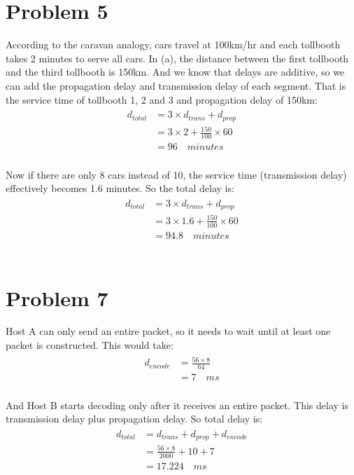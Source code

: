 \documentclass[titlepage, paper=a4, fontsize=11pt]{scrartcl} %
\numberwithin{equation}{section} %
\numberwithin{figure}{section} %
\numberwithin{table}{section} %
\begin{document}
\section*{Problem 5}
According to the caravan analogy, cars travel at 100km/hr and each tollbooth takes 2 minutes to serve all cars.
In (a), the distance between the first tollbooth and the third tollbooth is 150km. And we know that delays are
additive, so we can add the propagation delay and transmission delay of each segment. That is the service time of
tollbooth 1, 2 and 3 and propagation delay of 150km:
\begin{align*} 
\begin{split}
d_{total} &= 3 \times d_{trans} + d_{prop} \\
&= 3 \times 2 + \frac{150}{100} \times 60 \\
&= 96 \quad minutes
\end{split}					
\end{align*}
\\
Now if there are only 8 cars instead of 10, the service time (transmission delay) effectively becomes 1.6 minutes.
So the total delay is:
\begin{align*} 
\begin{split}
d_{total} &= 3 \times d_{trans} + d_{prop} \\
&= 3 \times 1.6 + \frac{150}{100} \times 60 \\
&= 94.8 \quad minutes
\end{split}					
\end{align*}
\\



\section*{Problem 7}
Host A can only send an entire packet, so it needs to wait until at least one packet is constructed. This would take:
\begin{align*} 
\begin{split}
d_{encode} &= \frac{56 \times 8}{64} \\
&= 7 \quad ms
\end{split}					
\end{align*}
\\
And Host B starts decoding only after it receives an entire packet. This delay is transmission delay plus propagation delay. So total delay is:
\begin{align*} 
\begin{split}
d_{total} &= d_{trans} + d_{prop} + d_{encode} \\
&= \frac{56 \times 8}{2000} + 10 + 7 \\
&= 17.224 \quad ms
\end{split}					
\end{align*}
\\
\end{document}
